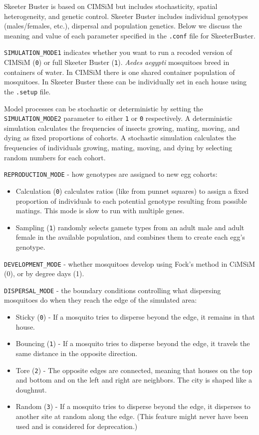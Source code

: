 \documentclass[11pt]{article}
\newcommand{\linecmd}[1]{\texttt{#1}}
\begin{document}
Skeeter Buster is based on CIMSiM \cite{focks1993dynamic} but includes stochasticity, spatial heterogeneity, and genetic control. Skeeter Buster includes individual genotypes (males/females, etc.), dispersal and population genetics. Below we discuss the meaning and value of each parameter specified in the \linecmd{.conf} file for SkeeterBuster.

\linecmd{SIMULATION\_MODE1} indicates whether you want to run a recoded version of CIMSiM (\linecmd{0}) or full Skeeter Buster (\linecmd{1}). \emph{Aedes aegypti} mosquitoes breed in containers of water. In CIMSiM there is one shared container population of mosquitoes. In Skeeter Buster these can be individually set in each house using the \linecmd{.setup} file. 

Model processes can be stochastic or deterministic by setting the \linecmd{SIMULATION\_MODE2} parameter to either \linecmd{1} or \linecmd{0} respectively. A deterministic simulation calculates the frequencies of insects growing, mating, moving, and dying as fixed proportions of cohorts. A stochastic simulation calculates the frequencies of individuals growing, mating, moving, and dying by selecting random numbers for each cohort.

\linecmd{REPRODUCTION\_MODE} - how genotypes are assigned to new egg cohorts:
\begin{itemize}
	\item Calculation (\linecmd{0}) calculates ratios (like from punnet squares) to assign a fixed proportion of individuals to each potential genotype resulting from possible matings. This mode is slow to run with multiple genes.
	\item Sampling (\linecmd{1}) randomly selects gamete types from an adult male and adult female in the available population, and combines them to create each egg's genotype.
\end{itemize}

\linecmd{DEVELOPMENT\_MODE} - whether mosquitoes develop using Fock's method in CiMSiM (0), or by degree days (1).

\linecmd{DISPERSAL\_MODE} - the boundary conditions controlling what dispersing mosquitoes do when they reach the edge of the simulated area:
\begin{itemize}
	\item Sticky (\linecmd{0}) - If a mosquito tries to disperse beyond the edge, it remains in that house.
	\item Bouncing (\linecmd{1}) - If a mosquito tries to disperse beyond the edge, it travels the same distance in the opposite direction.
	\item Tore (\linecmd{2}) - The opposite edges are connected, meaning that houses on the top and bottom and on the left and right are neighbors. The city is shaped like a doughnut.
	\item Random (\linecmd{3}) - If a mosquito tries to disperse beyond the edge, it disperses to another site at random along the edge. (This feature might never have been used and is considered for deprecation.)
\end{itemize}
\end{document}
